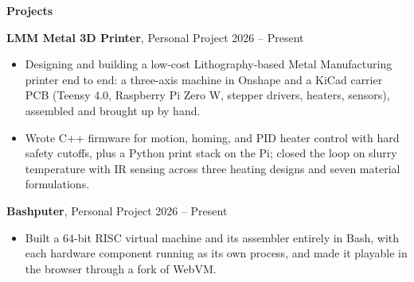 \begin{center}
    \textbf{Projects}
\end{center}
\textbf{LMM Metal 3D Printer}, Personal Project \hfill 2026 -- Present
\begin{itemize}[noitemsep, topsep=0pt, partopsep=0pt, parsep=0pt]
    \item Designing and building a low-cost Lithography-based Metal Manufacturing printer end to end: a three-axis machine in Onshape and a KiCad carrier PCB (Teensy 4.0, Raspberry Pi Zero W, stepper drivers, heaters, sensors), assembled and brought up by hand.

    \item Wrote C++ firmware for motion, homing, and PID heater control with hard safety cutoffs, plus a Python print stack on the Pi; closed the loop on slurry temperature with IR sensing across three heating designs and seven material formulations.
\end{itemize}

\vspace{12pt}

\textbf{Bashputer}, Personal Project \hfill 2026 -- Present
\begin{itemize}[noitemsep, topsep=0pt, partopsep=0pt, parsep=0pt]
    \item Built a 64-bit RISC virtual machine and its assembler entirely in Bash, with each hardware component running as its own process, and made it playable in the browser through a fork of WebVM.
\end{itemize}
